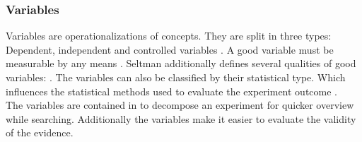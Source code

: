 
\subsubsection{Variables}

Variables are operationalizations of concepts. They are split in three types: Dependent, independent and controlled variables \cite{BuddiesVariables,Seltman2015}. A good variable must be measurable by any means \cite{BuddiesVariables}. Seltman additionally defines several qualities of good variables:  \cite[p. 10]{Seltman2015}. The variables can also be classified by their statistical type. Which influences the statistical methods used to evaluate the experiment outcome \cite[p. 12-16]{Seltman2015}.\\
The variables are contained in \briefingform to decompose an experiment for quicker overview while searching. Additionally the variables make it easier to evaluate the validity of the evidence.